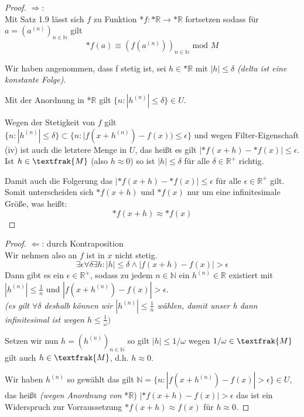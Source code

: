 \documentclass[a4paper]{article}
\begin{document}
\begin{proof}
      $ \Rightarrow $: \\
      Mit Satz 1.9 lässt sich $ f $ zu Funktion *$f: \text{*}\mathbb{R} \to \text{*}\mathbb{R} $ fortsetzen sodass für 
      $ a = (a^{(n)})_{n\in\mathbb{N}} $ gilt 
      $$ \text{*}f(a) \equiv (f(a^{(n)}))_{n\in\mathbb{N}} \text{ mod } M $$

      \smallskip
      Wir haben angenommen, dass f stetig ist, sei $ h \in \text{*}\mathbb{R} $ mit $ |h| \leqslant \delta $ \textit{(delta ist eine konstante Folge)}.

      \smallskip
      Mit der Anordnung in *$\mathbb{R}$ gilt $ \{n: |h^{(n)}| \leqslant \delta\} \in U $. 
      
      \smallskip
      Wegen der Stetigkeit von $ f $ gilt
      $ \{n: |h^{(n)}| \leqslant \delta\} \subset \{n: |f(x + h^{(n)}) - f(x)) \leqslant \epsilon\} $ 
      und wegen Filter-Eigenschaft (iv) ist auch die letztere Menge in $ U $, das 
      heißt es gilt $ |\text{*}f(x + h) - \text{*}f(x)| \leqslant \epsilon $. Ist $ h \in \textfrak{M} $ 
      (also $ h \approx 0 $) so ist $ |h| \leqslant \delta $ für alle $ \delta \in \mathbb{R}^+ $ richtig. 

      Damit auch die Folgerung das $ |\text{*}f(x + h) - \text{*}f(x)| \leqslant \epsilon $ für alle
      $ \epsilon \in  \mathbb{R}^+ $ gilt. Somit unterscheiden sich $ \text{*}f(x + h) $ und $  \text{*}f(x) $ nur
      um eine infinitesimale Größe, was heißt:
      $$ \text{*}f(x + h) \approx *f(x) $$
\end{proof}

\begin{proof}
      $ \Leftarrow $: durch Kontraposition \\
      Wir nehmen also an $ f $ ist in $ x $ nicht stetig. 
      $$ \exists \epsilon \forall \delta \exists h: |h| \leqslant \delta \wedge |f(x + h) - f(x)| > \epsilon $$
      Dann gibt es ein $ \epsilon \in \mathbb{R}^+ $, sodass 
      zu jedem $ n \in \mathbb{N} $ ein $ h^{(n)} \in \mathbb{R} $ existiert mit $ |h^{(n)}| \leqslant \frac{1}{n} $
      und $ |f(x + h^{(n)}) - f(x)| > \epsilon $. \\ 
      \textit{(es gilt $ \forall \delta $ deshalb können wir $ |h^{(n)}| \leqslant \frac{1}{n} $ wählen, damit unser h dann infinitesimal ist wegen $ h \leqslant \frac{1}{\omega})$}

      \smallskip
      Setzen wir nun $ h = (h^{(n)})_{n\in\mathbb{N}} $ so gilt $ |h| \leqslant 1/\omega $ wegen 
      $ 1/\omega \in \textfrak{M} $ gilt auch $ h \in \textfrak{M} $, d.h. $ h \approx 0 $.

      \smallskip
      Wir haben $ h^{(n)} $ so gewählt das gilt $ \mathbb{N} = \{n: |f(x + h^{(n)}) - f(x)| > \epsilon \} \in U $,
      das heißt \textit{(wegen Anordnung von }*$\mathbb{R}$) $ |\text{*}f(x + h) - f(x)| > \epsilon $ das ist ein Widerspruch zur Vorraussetzung 
      $\text{*}f(x + h) \approx f(x) $ für $ h \approx 0$. 

\end{proof}
\end{document}
